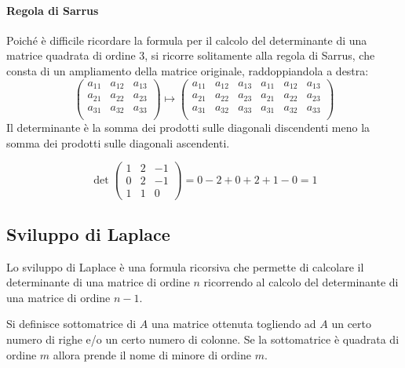 \paragraph*{Regola di Sarrus}
Poiché è difficile ricordare la formula per il calcolo del determinante di una matrice quadrata di ordine 3, si ricorre solitamente alla regola di Sarrus, che consta di un ampliamento della matrice originale, raddoppiandola a destra:
$$
  \begin{pmatrix}
    a_{11} & a_{12} & a_{13} \\
    a_{21} & a_{22} & a_{23} \\
    a_{31} & a_{32} & a_{33} \\
  \end{pmatrix}
  \mapsto 
  \begin{pmatrix}
    a_{11} & a_{12} & a_{13} & a_{11} & a_{12} & a_{13} \\
    a_{21} & a_{22} & a_{23} & a_{21} & a_{22} & a_{23} \\
    a_{31} & a_{32} & a_{33} & a_{31} & a_{32} & a_{33} \\
  \end{pmatrix}
$$
Il determinante è la somma dei prodotti sulle diagonali discendenti meno la somma dei prodotti sulle diagonali ascendenti.

\begin{example}
  $$
    \det
    \begin{pmatrix}
      1 & 2 & -1 \\
      0 & 2 & -1 \\
      1 & 1 & 0  
    \end{pmatrix}=
    0-2+0+2+1-0=1
  $$
\end{example}

\subsection*{Sviluppo di Laplace}
Lo sviluppo di Laplace è una formula ricorsiva che permette di calcolare il determinante di una matrice di ordine $n$ ricorrendo al calcolo del determinante di una matrice di ordine $n-1$.

\begin{definition}[Sottomatrice]
  Si definisce sottomatrice di $A$ una matrice ottenuta togliendo ad $A$ un certo numero di righe e/o un certo numero di colonne. Se la sottomatrice è quadrata di ordine $m$ allora prende il nome di minore di ordine $m$.
\end{definition}

